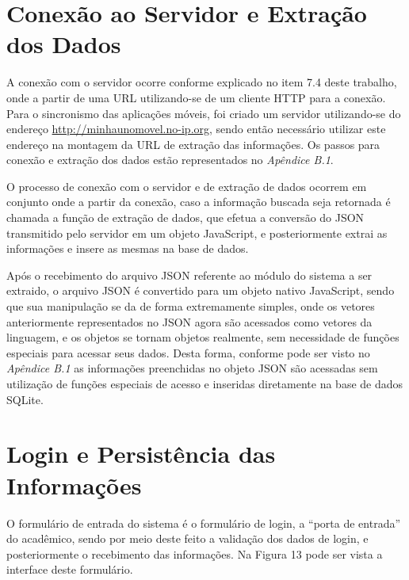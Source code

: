\section{Conexão ao Servidor e Extração dos Dados}
A conexão com o servidor ocorre conforme explicado no item 7.4 deste trabalho, onde a partir de uma URL utilizando-se de um cliente HTTP para a conexão. Para o sincronismo das aplicações móveis, foi criado um servidor utilizando-se do endereço \url{http://minhaunomovel.no-ip.org}, sendo então necessário utilizar este endereço na montagem da URL de extração das informações. Os passos para conexão e extração dos dados estão representados no \emph{Apêndice B.1}.

O processo de conexão com o servidor e de extração de dados ocorrem em conjunto onde a partir da conexão, caso a informação buscada seja retornada é chamada a função de extração de dados, que efetua a conversão do JSON transmitido pelo servidor em um objeto JavaScript, e posteriormente extrai as informações e insere as mesmas na base de dados. 

Após o recebimento do arquivo JSON referente ao módulo do sistema a ser extraido, o arquivo JSON é convertido para um objeto nativo JavaScript, sendo que sua manipulação se da de forma extremamente simples, onde os vetores anteriormente representados no JSON agora são acessados como vetores da linguagem, e os objetos se tornam objetos realmente, sem necessidade de funções especiais para acessar seus dados. Desta forma, conforme pode ser visto no \emph{Apêndice B.1} as informações preenchidas no objeto JSON são acessadas sem utilização de funções especiais de acesso e inseridas diretamente na base de dados SQLite.

\section{Login e Persistência das Informações}
O formulário de entrada do sistema é o formulário de login, a ``porta de entrada'' do acadêmico, sendo por meio deste feito a validação dos dados de login, e posteriormente o recebimento das informações. Na Figura 13 pode ser vista a interface deste formulário.

